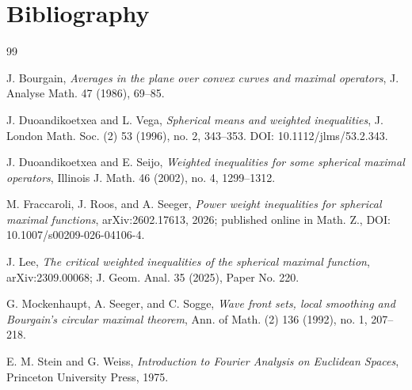 \documentclass[11pt,a4paper]{article}
\theoremstyle{definition}
\theoremstyle{remark}
\begin{document}
\section{Bibliography}

{\small
\setlength{\parskip}{0pt}
\begin{thebibliography}{99}

J. Bourgain,
\emph{Averages in the plane over convex curves and maximal operators},
J. Analyse Math. 47 (1986), 69--85.

J. Duoandikoetxea and L. Vega,
\emph{Spherical means and weighted inequalities},
J. London Math. Soc. (2) 53 (1996), no. 2, 343--353.
DOI: 10.1112/jlms/53.2.343.

J. Duoandikoetxea and E. Seijo,
\emph{Weighted inequalities for some spherical maximal operators},
Illinois J. Math. 46 (2002), no. 4, 1299--1312.

M. Fraccaroli, J. Roos, and A. Seeger,
\emph{Power weight inequalities for spherical maximal functions},
arXiv:2602.17613, 2026; published online in Math. Z.,
DOI: 10.1007/s00209-026-04106-4.

J. Lee,
\emph{The critical weighted inequalities of the spherical maximal function},
arXiv:2309.00068; J. Geom. Anal. 35 (2025), Paper No. 220.

G. Mockenhaupt, A. Seeger, and C. Sogge,
\emph{Wave front sets, local smoothing and Bourgain's circular maximal theorem},
Ann. of Math. (2) 136 (1992), no. 1, 207--218.

E. M. Stein and G. Weiss,
\emph{Introduction to Fourier Analysis on Euclidean Spaces},
Princeton University Press, 1975.

\end{thebibliography}
}
\end{document}
